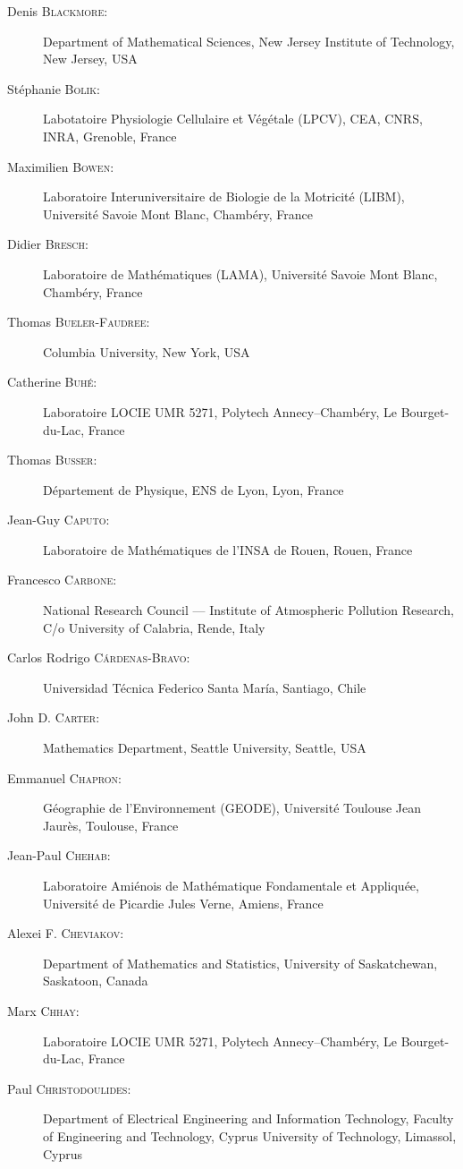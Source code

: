 \begin{description}
  \item[Denis \textsc{Blackmore}:] Department of Mathematical Sciences, New Jersey Institute of Technology, New Jersey, USA
  \item[St\'ephanie \textsc{Bolik}:] Labotatoire Physiologie Cellulaire et V\'eg\'etale (LPCV), CEA, CNRS, INRA, Grenoble, France
  \item[Maximilien \textsc{Bowen}:] Laboratoire Interuniversitaire de Biologie de la Motricit\'e (LIBM), Universit\'e Savoie Mont Blanc, Chamb\'ery, France
  \item[Didier \textsc{Bresch}:] Laboratoire de Math\'ematiques (LAMA), Universit\'e Savoie Mont Blanc, Chamb\'ery, France
  \item[Thomas \textsc{Bueler-Faudree}:] Columbia University, New York, USA
  \item[Catherine \textsc{Buh\'e}:] Laboratoire LOCIE UMR 5271, Polytech Annecy--Chamb\'ery, Le Bourget-du-Lac, France
  \item[Thomas \textsc{Busser}:] D\'epartement de Physique, ENS de Lyon, Lyon, France
  \item[Jean-Guy \textsc{Caputo}:] Laboratoire de Math\'ematiques de l'INSA de Rouen, Rouen, France
  \item[Francesco \textsc{Carbone}:] National Research Council --- Institute of Atmospheric Pollution Research, C/o University of Calabria, Rende, Italy
  \item[Carlos Rodrigo \textsc{Cárdenas-Bravo}:] Universidad Técnica Federico Santa María, Santiago, Chile
  \item[John D. \textsc{Carter}:] Mathematics Department, Seattle University, Seattle, USA
  \item[Emmanuel \textsc{Chapron}:] G\'eographie de l'Environnement (GEODE), Universit\'e Toulouse Jean Jaur\`es, Toulouse, France
  \item[Jean-Paul \textsc{Chehab}:] Laboratoire Ami\'enois de Math\'ematique Fondamentale et Appliqu\'ee, Universit\'e de Picardie Jules Verne, Amiens, France
  \item[Alexei F. \textsc{Cheviakov}:] Department of Mathematics and Statistics, University of Saskatchewan, Saskatoon, Canada
  \item[Marx \textsc{Chhay}:] Laboratoire LOCIE UMR 5271, Polytech Annecy--Chamb\'ery, Le Bourget-du-Lac, France
  \item[Paul \textsc{Christodoulides}:] Department of Electrical Engineering and Information Technology, Faculty of Engineering and Technology, Cyprus University of Technology, Limassol, Cyprus

\end{description}
